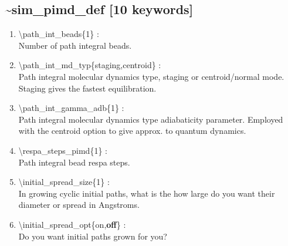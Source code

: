\documentclass[12pt,titlepage]{article}
\begin{document}
\newpage
\subsection*{\bf \~{}sim\_pimd\_def [10 keywords]}

\begin{enumerate}

 \vspace{0.15in} 
 \item  \textbackslash{}path\_int\_beads\{1\} : \\
     Number of path integral beads.

 \vspace{0.15in} 
 \item  \textbackslash{}path\_int\_md\_typ\{staging,centroid\} : \\
     Path integral molecular dynamics type, staging or centroid/normal mode.
     Staging gives the fastest equilibration.

 \vspace{0.15in} 
 \item  \textbackslash{}path\_int\_gamma\_adb\{1\} : \\
     Path integral molecular dynamics type adiabaticity parameter.
     Employed with the centroid option to give approx. to quantum dynamics.

 \vspace{0.15in} 
 \item  \textbackslash{}respa\_steps\_pimd\{1\} : \\
     Path integral bead respa steps.

 \vspace{0.15in} 
 \item  \textbackslash{}initial\_spread\_size\{1\} : \\
    In growing cyclic initial paths, what is the how large do you
    want their diameter or spread in Angstroms.

 \vspace{0.15in} 
 \item  \textbackslash{}initial\_spread\_opt\{on,{\bf off}\} : \\
    Do you want initial paths grown for you?

\end{enumerate}

\newpage
\newpage
\end{document}
